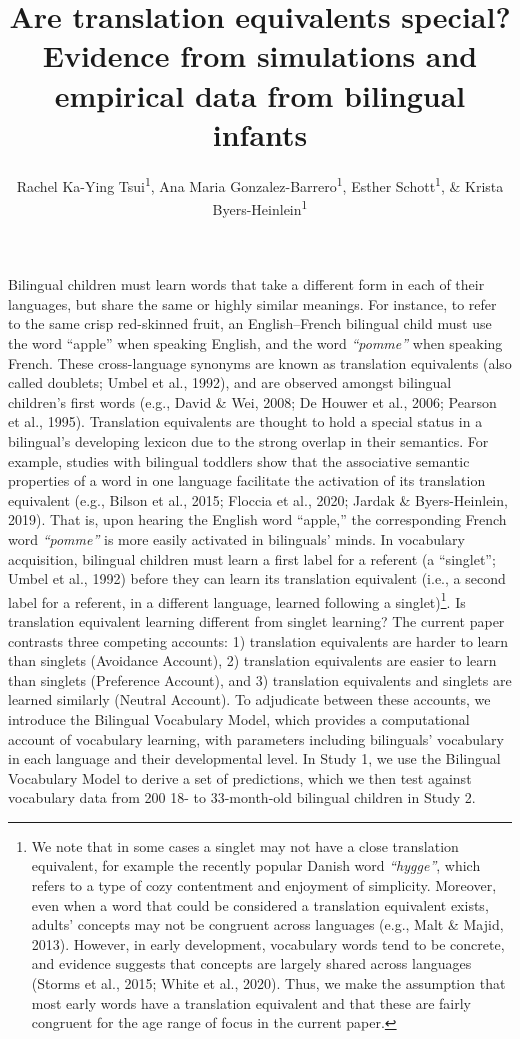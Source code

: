 \documentclass[
  english,
  ,man,floatsintext]{apa6}
\title{Are translation equivalents special? Evidence from simulations and empirical data from bilingual infants}
\author{Rachel Ka-Ying Tsui\textsuperscript{1}, Ana Maria Gonzalez-Barrero\textsuperscript{1}, Esther Schott\textsuperscript{1}, \& Krista Byers-Heinlein\textsuperscript{1}}
\date{}
\affiliation{\vspace{0.5cm}\textsuperscript{1} Concordia University}
\begin{document}
\maketitle

\captionsetup[table]{labelformat=empty}

Bilingual children must learn words that take a different form in each of their languages, but share the same or highly similar meanings. For instance, to refer to the same crisp red-skinned fruit, an English--French bilingual child must use the word ``apple'' when speaking English, and the word \emph{``pomme''} when speaking French. These cross-language synonyms are known as translation equivalents (also called doublets; Umbel et al., 1992), and are observed amongst bilingual children's first words (e.g., David \& Wei, 2008; De Houwer et al., 2006; Pearson et al., 1995). Translation equivalents are thought to hold a special status in a bilingual's developing lexicon due to the strong overlap in their semantics. For example, studies with bilingual toddlers show that the associative semantic properties of a word in one language facilitate the activation of its translation equivalent (e.g., Bilson et al., 2015; Floccia et al., 2020; Jardak \& Byers-Heinlein, 2019). That is, upon hearing the English word ``apple,'' the corresponding French word \emph{``pomme''} is more easily activated in bilinguals' minds. In vocabulary acquisition, bilingual children must learn a first label for a referent (a ``singlet''; Umbel et al., 1992) before they can learn its translation equivalent (i.e., a second label for a referent, in a different language, learned following a singlet)\footnote{We note that in some cases a singlet may not have a close translation equivalent, for example the recently popular Danish word \emph{``hygge''}, which refers to a type of cozy contentment and enjoyment of simplicity. Moreover, even when a word that could be considered a translation equivalent exists, adults' concepts may not be congruent across languages (e.g., Malt \& Majid, 2013). However, in early development, vocabulary words tend to be concrete, and evidence suggests that concepts are largely shared across languages (Storms et al., 2015; White et al., 2020). Thus, we make the assumption that most early words have a translation equivalent and that these are fairly congruent for the age range of focus in the current paper.}. Is translation equivalent learning different from singlet learning? The current paper contrasts three competing accounts: 1) translation equivalents are harder to learn than singlets (Avoidance Account), 2) translation equivalents are easier to learn than singlets (Preference Account), and 3) translation equivalents and singlets are learned similarly (Neutral Account). To adjudicate between these accounts, we introduce the Bilingual Vocabulary Model, which provides a computational account of vocabulary learning, with parameters including bilinguals' vocabulary in each language and their developmental level. In Study 1, we use the Bilingual Vocabulary Model to derive a set of predictions, which we then test against vocabulary data from 200 18- to 33-month-old bilingual children in Study 2.
\end{document}
